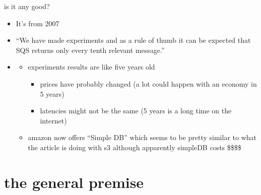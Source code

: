 \documentclass{beamer}
\begin{document}
  \begin{frame}{is it any good?}
    \begin{itemize}
      \item
        It's from 2007
      \item
        ``We have made experiments and as a rule of thumb it can be expected that SQS returns only every tenth relevant message.''
      \item
       
        \begin{itemize}
        \item
          experiments results are like five years old
          \begin{itemize}
          \item
            prices have probably changed (a lot could happen with an economy in 5 years)
          \item 
            latencies might not be the same (5 years is a long time on the internet)
          \end{itemize}
        \item
          amazon now offers ``Simple DB'' which seems to be pretty similar to what the article is doing with s3 although apparently simpleDB costs \$\$\$\$
        \end{itemize}
      \end{itemize}
    \end{frame}

\section{the general premise}
\end{document}
